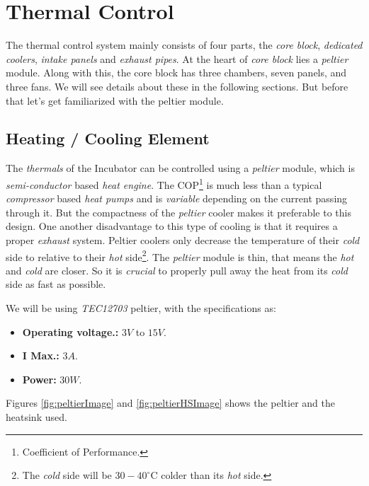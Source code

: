 \documentclass[../../main]{subfiles}
\begin{document}
\section{Thermal Control} \label{sec:}

The thermal control system mainly consists of four parts, the \emph{core
block}, \emph{dedicated coolers}, \emph{intake panels} and \emph{exhaust
pipes}. At the heart of \emph{core block} lies a \emph{peltier} module. Along
with this, the core block has three chambers, seven panels, and three fans. We
will see details about these in the following sections. But before that let's
get familiarized with the peltier module.

\subsection{Heating / Cooling Element}

The \emph{thermals} of the Incubator can be controlled using a \emph{peltier} module, which is
\emph{semi-conductor} based \emph{heat engine}. The COP\footnote{Coefficient of Performance.} is
much less than a typical \emph{compressor} based \emph{heat pumps} and is \emph{variable} depending
on the current passing through it. But the compactness of the \emph{peltier} cooler makes it preferable
to this design. One another disadvantage to this type of cooling is that it requires a proper \emph{exhaust}
system. Peltier coolers only decrease the temperature of their \emph{cold} side to relative to their
\emph{hot} side\footnote{The \emph{cold} side will be $30 - 40^\circ$C colder than its \emph{hot} side.}.
The \emph{peltier} module is thin, that means the \emph{hot} and \emph{cold} are closer. So it is
\emph{crucial} to properly pull away the heat from its \emph{cold} side as fast as possible.

We will be using \emph{TEC12703} peltier, with the specifications as:

\begin{itemize}
    \item \textbf{Operating voltage.:} $3\si{V}$ to $15\si{V}$.
    \item \textbf{I Max.:} $3\si{A}$.
    \item \textbf{Power:} $30\si{W}$.
\end{itemize}

Figures \ref{fig:peltierImage} and \ref{fig:peltierHSImage} shows the peltier and the heatsink
used.
\end{document}
